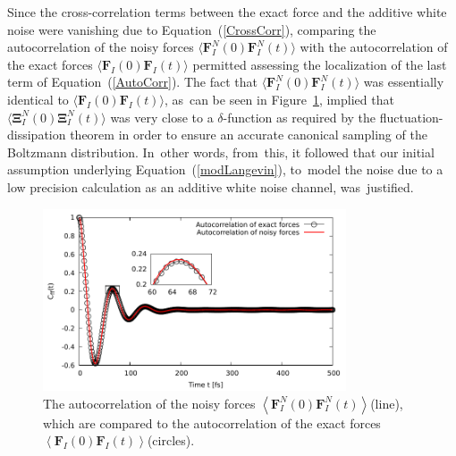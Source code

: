 \documentclass[computation,article,accept,moreauthors,pdftex]{Definitions/mdpi}
\begin{document}
Since the cross-correlation terms between the exact force and the additive white noise were vanishing due to Equation~(\ref{CrossCorr}), comparing the autocorrelation of the noisy forces $\langle \textbf{F}_{I}^{N}(0)\textbf{F}_{I}^{N}(t)\rangle$ with the autocorrelation of the exact forces $\langle \textbf{F}_{I}(0) \textbf{F}_{I}(t)\rangle$ permitted assessing the localization of the last term of Equation~(\ref{AutoCorr}).
The fact that $\langle \textbf{F}_{I}^{N}(0)\textbf{F}_{I}^{N}(t)\rangle$ was essentially identical to $\langle \textbf{F}_{I}(0) \textbf{F}_{I}(t)\rangle$, as~can be seen in Figure~\ref{Fig4}, implied that $\langle \mathbf{\Xi } _{I}^{N}(0) \mathbf{\Xi } _{I}^{N}(t)\rangle$ was very close to a $\delta$-function as required by the fluctuation-dissipation theorem in order to ensure an accurate canonical sampling of the Boltzmann distribution. In~other words, from~this, it followed that our initial assumption underlying Equation~(\ref{modLangevin}), to~model the noise due to a low precision calculation as an additive white noise channel, was~justified.
\begin{figure}[H]
\begin{center}
\includegraphics[width=0.8\textwidth]
{AutocorrelationPlot_n.pdf}
\end{center}
\caption{\label{Fig4}
The autocorrelation of the noisy forces \(
\left \langle \textbf{F}_{I}^{N}\left ( 0 \right ) \textbf{F}_{I}^{N}\left ( t \right )\right \rangle \)(line), which are compared to the autocorrelation of the exact forces \( \left \langle \textbf{F}_{I}\left ( 0 \right ) \textbf{F}_{I}\left ( t \right )\right \rangle \)(circles).
} \end{figure}
\unskip

\end{document}
